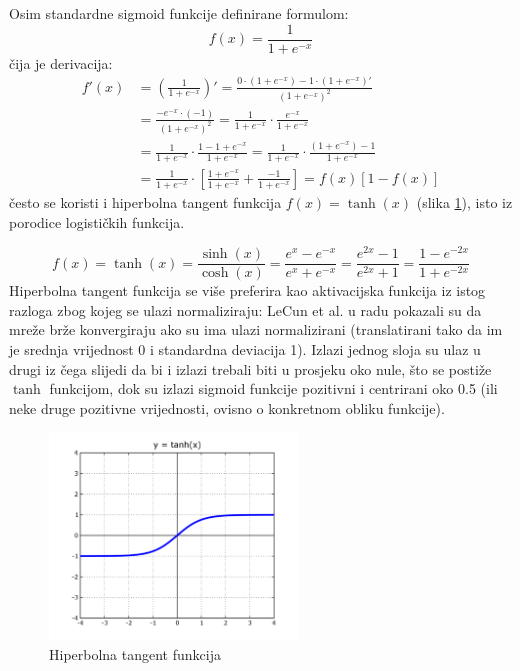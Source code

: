\documentclass[times, utf8, diplomski, numeric]{fer}
\begin{document}
Osim standardne sigmoid funkcije definirane formulom:
\begin{equation}
f(x) = \frac{1}{1+e^{-x}}
\label{eq:logisticka_funkcija}
\end{equation}
čija je derivacija:
\begin{equation}
\begin{split}
  f' (x) &= \left( \frac{1}{1 + e^{-x}} \right)' = \frac{0 \cdot (1 + e^{-x}) - 1 \cdot (1 + e^{-x})'}{(1 + e^{-x})^2} \\
         &= \frac{-e^{-x} \cdot (-1)}{(1 + e^{-x})^2} = \frac{1}{1 + e^{-x}} \cdot \frac{e^{-x}}{1 + e^{-x}} \\
		 &= \frac{1}{1 + e^{-x}} \cdot \frac{1 - 1 + e^{-x}}{1 + e^{-x}} = \frac{1}{1 + e^{-x}} \cdot \frac{(1 + e^{-x}) - 1}{1 + e^{-x}} \\
		 &= \frac{1}{1 + e^{-x}} \cdot \left[ \frac{1 + e^{-x}}{1 + e^{-x}} + \frac{-1}{1 + e^{-x}} \right] = f(x) \left[ 1 - f(x) \right]
\end{split}
\end{equation}
često se koristi i hiperbolna tangent funkcija $f(x) = \tanh(x)$ (slika \ref{fig:tanh_plot}), isto iz porodice logističkih funkcija.

\begin{equation}
f(x) = \tanh(x) = \frac{\sinh(x)}{\cosh(x)} = \frac{e^{x} - e^{-x}}{e^{x} + e^{-x}} = \frac{e^{2x} - 1}{e^{2x} + 1} = \frac{1 - e^{-2x}}{1 + e^{-2x}}
\label{eq:tanh_def}
\end{equation}
Hiperbolna tangent funkcija se više preferira kao aktivacijska funkcija iz istog razloga zbog kojeg se ulazi normaliziraju: LeCun et al. u radu \cite{lecun-98b} pokazali su da mreže brže konvergiraju ako su ima ulazi normalizirani (translatirani tako da im je srednja vrijednost 0 i standardna deviacija 1). Izlazi jednog sloja su ulaz u drugi iz čega slijedi da bi i izlazi trebali biti u prosjeku oko nule, što se postiže $\tanh$ funkcijom, dok su izlazi sigmoid funkcije pozitivni i centrirani oko 0.5 (ili neke druge pozitivne vrijednosti, ovisno o konkretnom obliku funkcije).

\begin{figure}[htb]
\centering
\includegraphics[width=250px]{imgs/tanh_plot.png}
\caption{Hiperbolna tangent funkcija}
\label{fig:tanh_plot}
\end{figure}
\end{document}
